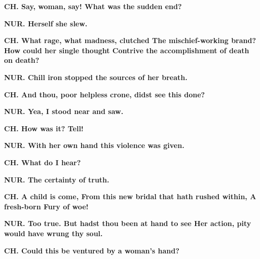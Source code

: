 \documentclass[11pt,letter]{book}
\begin{document}
\par \textbf{CH. Say, woman, say! What was the sudden end?}
\par 

\par \textbf{NUR. Herself she slew.}
\par 

\par \textbf{CH. What rage, what madness, clutched The mischief-working brand? How could her single thought Contrive the accomplishment of death on death?}
\par 

\par \textbf{NUR. Chill iron stopped the sources of her breath.}
\par 

\par \textbf{CH. And thou, poor helpless crone, didst see this done?}
\par 

\par \textbf{NUR. Yea, I stood near and saw.}
\par 

\par \textbf{CH. How was it? Tell!}
\par 

\par \textbf{NUR. With her own hand this violence was given.}
\par 

\par \textbf{CH. What do I hear?}
\par 

\par \textbf{NUR. The certainty of truth.}
\par 

\par \textbf{CH. A child is come, From this new bridal that hath rushed within, A fresh-born Fury of woe!}
\par 

\par \textbf{NUR. Too true. But hadst thou been at hand to see Her action, pity would have wrung thy soul.}
\par 

\par \textbf{CH. Could this be ventured by a woman’s hand?}
\par 
\end{document}
